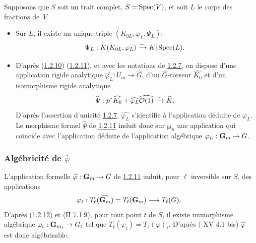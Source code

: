 \documentclass[10pt]{../fichiers-configuration-latex/smfart}
\begin{document}
Supposons que $S$ soit un trait complet, $S=\operatorname{Spec}(V)$, et soit $L$ le
corps des fractions de~$V$.
\begin{itemize}
\item[a)] Sur $L$, il existe un unique triple
  $(K_{0L},\varphi_{L},\Psi_{L})$:
$$
\Psi_{L}:K(K_{0L},\varphi_{L})\xrightarrow{\sim} K|\operatorname{Spec} (L){}.
$$

\item[b)] D'après (\hyperref[XVIII.subsubsec1.2.10]{1.2.10}) (\hyperref[XVIII.subsubsec1.2.11]{1.2.11}),
et avec les notations de \hyperref[XVIII.subsubsec1.2.7]{1.2.7},
  on dispose d'une application rigide analytique
  $\widehat{\varphi_{L}}:U_{m}\rightarrow \widehat{G}$, d'un
  $\widehat{G}$-torseur $\widehat{K_{0}}$ et d'un
  isomorphisme rigide analytique
$$
\widehat{\Psi}:p^{\ast}\widehat{K_0}+\widehat{\varphi_{L}}
\widehat{{\mathcal O}(1)}\xrightarrow{\sim}
\widehat{K}{}.
$$
D'après l'assertion d'unicité \hyperref[XVIII.subsubsec1.2.7]{1.2.7},
$\widehat{\varphi_{L}}$ 
s'identifie à l'application déduite de $\varphi_{L}$. Le morphisme
formel $\widehat{\Psi}$ de \hyperref[XVIII.subsubsec1.2.11]{1.2.11} induit donc sur
$𝛍_{n}$ une application qui 
coïncide avec l'application déduite de l'application algébrique
$\varphi_{L}:\mathbf{G}_{m}\rightarrow G$.
\end{itemize}

\subsubsection{Algébricité de $\widehat{\varphi}$}

L'application formelle $\widehat{\varphi}:\mathbf{G}_{m}\rightarrow G$
de \hyperref[XVIII.subsubsec1.2.11]{1.2.11} induit, pour $\ell$ inversible sur $S$,
des applications 
$$
\varphi_{\ell}:T_{\ell}(\widehat{\mathbf{G}_{m}})=T_{\ell}(\mathbf{G}_{m})\longrightarrow
T_{\ell}(G){}.
$$
D'après (1.2.12) et (\EGA II 7.1.9), pour tout point $t$ de $S$, il
existe un\pageoriginale  morphisme algébrique
$\varphi_{t}:\mathbf{G}_{m_{t}}\rightarrow G_{t}$ tel que
$T_{\ell}(\varphi_{t})=T_{\ell}(\varphi)_{t}$. D'après ( XV 4.1
  bis) $\widehat{\varphi}$ est donc algébrisable.
\end{document}
